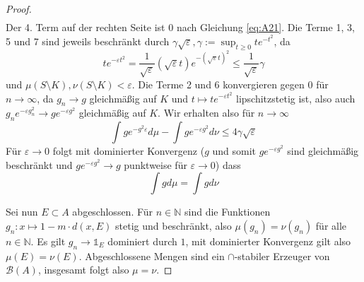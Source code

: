 \begin{proof}
\begin{align*}
    \end{align*}
    Der 4. Term auf der rechten Seite ist 0 nach Gleichung \ref{eq:A21}. Die Terme 1, 3, 5 und 7 sind jeweils beschränkt durch $\gamma \sqrt{\varepsilon}, \gamma:=\sup_{t\geq 0}te^{-t^2}$, da 
    $$te^{-\varepsilon t^2}=\frac{1}{\sqrt{\varepsilon}}(\sqrt{\varepsilon} t)e^{-(\sqrt{\varepsilon}t)^2} \leq \frac{1}{\sqrt{\varepsilon}} \gamma$$
    und $\mu(S\setminus K), \nu(S\setminus K) < \varepsilon$. Die Terme 2 und 6 konvergieren gegen $0$ für $n\rightarrow \infty$, da $g_n \rightarrow g$ gleichmäßig auf $K$ und $t \mapsto te^{-\varepsilon t^2}$ lipschitzstetig ist, also auch $g_n e^{-\varepsilon g_n^2} \rightarrow g e^{-\varepsilon g^2}$ gleichmäßig auf $K$. Wir erhalten also für $n\rightarrow \infty$
    $$\int ge^{-g^2\varepsilon}d\mu - \int ge^{-\varepsilon g^2} d\nu \leq 4\gamma\sqrt{\varepsilon}$$
    Für $\varepsilon \rightarrow 0$ folgt mit dominierter Konvergenz ($g$ und somit $ge^{-\varepsilon g^2}$ sind gleichmäßig beschränkt und $ge^{-\varepsilon g^2} \rightarrow g$ punktweise für $\varepsilon \rightarrow 0$) dass
    $$\int gd\mu = \int gd\nu$$

    Sei nun $E \subset A$ abgeschlossen. Für $n\in \mathbb{N}$ sind die Funktionen $g_n: x \mapsto 1 - m \cdot d(x, E)$ stetig und beschränkt, also $\mu(g_n) = \nu(g_n)$ für alle $n \in \mathbb{N}$. Es gilt $g_n \rightarrow \mathds{1}_E$ dominiert durch $1$, mit dominierter Konvergenz gilt also $\mu(E)=\nu(E)$. Abgeschlossene Mengen sind ein $\cap$-stabiler Erzeuger von $\mathcal{B}(A)$, insgesamt folgt also $\mu=\nu$.
\end{proof}